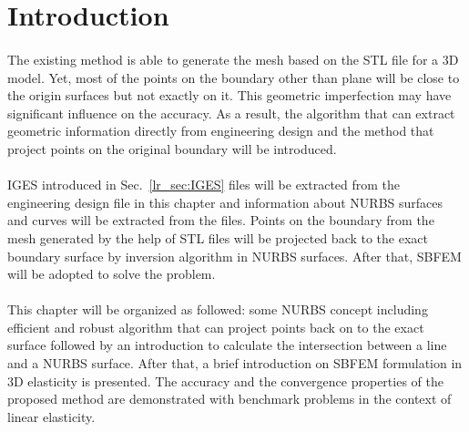 \section{Introduction}
\paragraph{}
The existing method is able to generate the mesh based on the STL file for a 3D model.
Yet, most of the points on the boundary other than plane will be close to the origin surfaces but not exactly on it.
This geometric imperfection may have significant influence on the accuracy.
As a result, the algorithm that can extract geometric information directly from engineering design and the method that project points on the original boundary will be introduced.

\paragraph{}
IGES introduced in Sec.~\ref{lr_sec:IGES} files will be extracted from the engineering design file in this chapter and information about NURBS surfaces and curves will be extracted from the files.
Points on the boundary from the mesh generated by the help of STL files will be projected back to the exact boundary surface by inversion algorithm in NURBS surfaces.
After that, SBFEM will be adopted to solve the problem.

\paragraph{}
This chapter will be organized as followed: some NURBS concept including efficient and robust algorithm that can project points back on to the exact surface followed by an introduction to calculate the intersection between a line and a NURBS surface.
After that, a brief introduction on SBFEM formulation in 3D elasticity is presented.
The accuracy and the convergence properties of the proposed method are demonstrated with benchmark problems in the context of linear elasticity.
